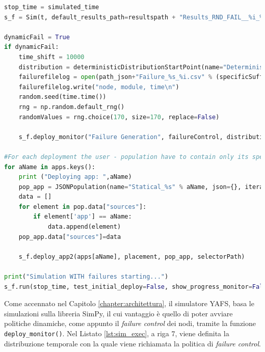 \begin{lstlisting}[language=python, caption={Creazione della simulazione.}, label={lst:sim_exec}, captionpos=b]
stop_time = simulated_time
s_f = Sim(t, default_results_path=resultspath + "Results_RND_FAIL__%i_%i" % (stop_time,it)) 

dynamicFail = True
if dynamicFail:
    time_shift = 10000
    distribution = deterministicDistributionStartPoint(name="Deterministic", time=time_shift,start=10000)
    failurefilelog = open(path_json+"Failure_%s_%i.csv" % (specificSuffix,stop_time),"w")
    failurefilelog.write("node, module, time\n")
    random.seed(time.time())
    rng = np.random.default_rng()
    randomValues = rng.choice(170, size=170, replace=False)
    
    s_f.deploy_monitor("Failure Generation", failureControl, distribution,sim=s,filelog=failurefilelog,ids=randomValues)

#For each deployment the user - population have to contain only its specific sources
for aName in apps.keys():
    print ("Deploying app: ",aName)
    pop_app = JSONPopulation(name="Statical_%s" % aName, json={}, iteration=it)
    data = []
    for element in pop.data["sources"]:
        if element['app'] == aName:
            data.append(element)
    pop_app.data["sources"]=data

    s_f.deploy_app2(apps[aName], placement, pop_app, selectorPath)

print("Simulation WITH failures starting...")
s_f.run(stop_time, test_initial_deploy=False, show_progress_monitor=False)
\end{lstlisting}

Come accennato nel Capitolo \ref{chapter:architettura}, il simulatore YAFS, basa le simulazioni sulla libreria SimPy, il cui vantaggio è quello di poter avviare politiche dinamiche, come appunto il \textit{failure control} dei nodi, tramite la funzione \texttt{deploy\_monitor()}. Nel Listato \ref{lst:sim_exec}, a riga 7, viene definita la distribuzione temporale con la quale viene richiamata la politica di \textit{failure control}.